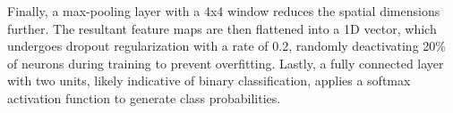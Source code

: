 		Finally, a max-pooling layer with a 4x4 window reduces the spatial dimensions further. The resultant feature maps are then flattened into a 1D vector, which undergoes dropout regularization with a rate of 0.2, randomly deactivating 20\% of neurons during training to prevent overfitting. Lastly, a fully connected layer with two units, likely indicative of binary classification, applies a softmax activation function to generate class probabilities.
	\newpage
	\begin{figure}[ht]
	\end{figure}

